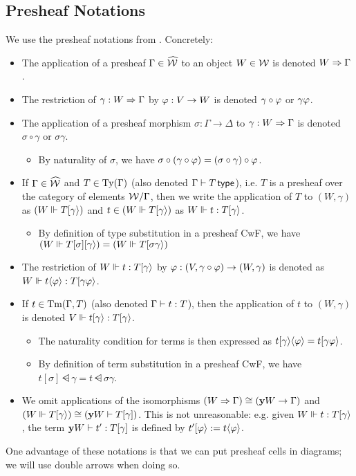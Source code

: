 \documentclass[a4paper]{memoir}
\begin{document}
\subsection{Presheaf Notations} \label{sec:notations:psh}
We use the presheaf notations from \cite{reldtt-techreport}. Concretely:
\begin{itemize}
	\item The application of a presheaf $\Gamma \in \widehat {{\mathcal{W}}}$ to an object $W \in {\mathcal{W}}$ is denoted $W \Rightarrow \Gamma$.
	\item The restriction of $\gamma : W \Rightarrow \Gamma$ by $\varphi : V \to W$ is denoted $\gamma \circ \varphi$ or $\gamma \varphi$.
	\item The application of a presheaf morphism $\sigma : \Gamma \to \Delta$ to $\gamma : W \Rightarrow \Gamma$ is denoted $\sigma \circ \gamma$ or $\sigma \gamma$.
	\begin{itemize}
		\item By naturality of $\sigma$, we have $\sigma \circ (\gamma \circ \varphi) = (\sigma \circ \gamma) \circ \varphi$.
	\end{itemize}
	\item If $\Gamma \in \widehat {{\mathcal{W}}}$ and $T \in {\mathrm{Ty}}(\Gamma)$ (also denoted $\Gamma \vdash T \,\mathsf{type}$), i.e. $T$ is a presheaf over the category of elements ${\mathcal{W}}/\Gamma$, then we write the application of $T$ to $(W, \gamma)$ as $(W \mathrel{\Vdash} T [ \gamma \rangle)$ and $t \in (W \mathrel{\Vdash} T [ \gamma \rangle)$ as $W \mathrel{\Vdash} t : T [ \gamma \rangle$.
	\begin{itemize}
		\item By definition of type substitution in a presheaf CwF, we have $(W \mathrel{\Vdash} T[\sigma] [ \gamma \rangle) = (W \mathrel{\Vdash} T [ \sigma \gamma \rangle)$
	\end{itemize}
	\item The restriction of $W \mathrel{\Vdash} t : T [ \gamma \rangle$ by $\varphi : (V, \gamma \circ \varphi) \to (W, \gamma)$ is denoted as $W \mathrel{\Vdash} t \langle \varphi \rangle : T [ \gamma \varphi \rangle$.
	\item If $t \in {\mathrm{Tm}}(\Gamma, T)$ (also denoted $\Gamma \vdash t : T$), then the application of $t$ to $(W, \gamma)$ is denoted $V \mathrel{\Vdash} t [ \gamma \rangle : T [ \gamma \rangle$.
	\begin{itemize}
		\item The naturality condition for terms is then expressed as $t [ \gamma \rangle \langle \varphi \rangle = t [ \gamma \varphi \rangle$.
		\item By definition of term substitution in a presheaf CwF, we have $t[\sigma] \dsub \gamma = t \dsub{\sigma \gamma}$.
	\end{itemize}
	\item We omit applications of the isomorphisms $(W \Rightarrow \Gamma) \cong ({\mathbf{y}} W \to \Gamma)$ and $(W \mathrel{\Vdash} T [ \gamma \rangle) \cong ({\mathbf{y}} W \vdash T [\gamma])$.
	This is not unreasonable: e.g. given $W \mathrel{\Vdash} t : T [ \gamma \rangle$, the term ${\mathbf{y}} W \vdash t' : T[\gamma]$ is defined by $t' [ \varphi \rangle := t \langle \varphi \rangle$.
\end{itemize}
One advantage of these notations is that we can put presheaf cells in diagrams; we will use double arrows when doing so.
\end{document}
